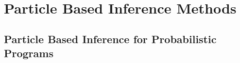 
\chapter{Particle Based Inference Methods}
\label{sec:part}




\section{Particle Based Inference for Probabilistic Programs}
\label{sec:part:probprog}